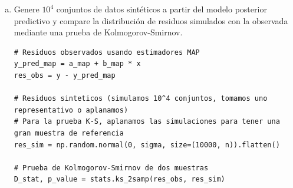 \documentclass[a4paper]{article}
\begin{document}
\begin{enumerate}[a)]
El resultado numérico para los intervalos bootstrap del 95\% fue:
\begin{equation}
  a \in [-7.4550,\,14.5516], \qquad
  b \in [-3.1659,\,17.4093].
\end{equation}
Estos intervalos son mucho más amplios que los intervalos de credibilidad
bayesianos del inciso~g), lo que indica mayor variabilidad bajo el
remuestreo bootstrap de la muestra observada.

	\item Genere $10^4$ conjuntos de datos sintéticos a partir del modelo posterior predictivo y compare la distribución de residuos simulados con la observada mediante una prueba de Kolmogorov-Smirnov.
	
	\begin{lstlisting}
# Residuos observados usando estimadores MAP
y_pred_map = a_map + b_map * x
res_obs = y - y_pred_map

# Residuos sinteticos (simulamos 10^4 conjuntos, tomamos uno representativo o aplanamos)
# Para la prueba K-S, aplanamos las simulaciones para tener una gran muestra de referencia
res_sim = np.random.normal(0, sigma, size=(10000, n)).flatten()

# Prueba de Kolmogorov-Smirnov de dos muestras
D_stat, p_value = stats.ks_2samp(res_obs, res_sim)
\end{lstlisting}

\begin{center}
\end{center}
\end{enumerate}
\end{document}
